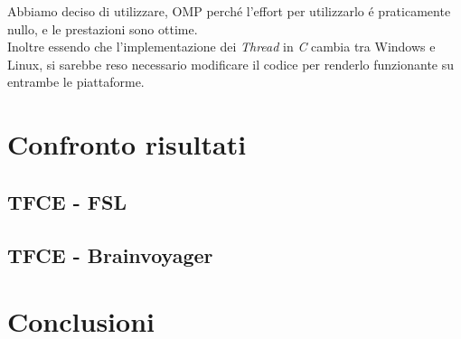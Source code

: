\documentclass{beamer}
\begin{document}
\begin{frame}
Abbiamo deciso di utilizzare, OMP perch\'e l'effort per utilizzarlo \'e praticamente nullo, e le prestazioni sono ottime.\\
\medskip
Inoltre essendo che l'implementazione dei \textit{Thread} in \textit{C} cambia tra Windows e Linux, si sarebbe reso necessario modificare il codice per renderlo funzionante su entrambe le piattaforme.
\end{frame}

\section{Confronto risultati}

\subsection{TFCE - FSL}
\begin{frame}
\end{frame}

\subsection{TFCE - Brainvoyager}
\begin{frame}
\end{frame}

\section{Conclusioni}
\begin{frame}
\end{frame}
\end{document}

